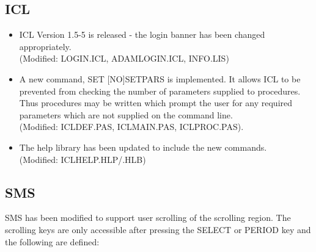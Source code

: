\subsection{ICL}
\begin{itemize}
\item ICL Version 1.5-5 is released - the login banner has been changed
appropriately.\\
(Modified: LOGIN.ICL, ADAMLOGIN.ICL, INFO.LIS)
\item A new command, SET [NO]SETPARS is implemented. It allows ICL to be
prevented from checking the number of parameters supplied to procedures.
Thus procedures may be written which prompt the user for any required parameters
which are not supplied on the command line.\\
(Modified: ICLDEF.PAS, ICLMAIN.PAS, ICLPROC.PAS).
\item The help library has been updated to include the new commands.\\
(Modified: ICLHELP.HLP/.HLB)
\end{itemize}

\subsection{SMS}
SMS has been modified to support user scrolling of the scrolling region.
The scrolling keys are only accessible after pressing the SELECT  or PERIOD
key and the following are defined:


